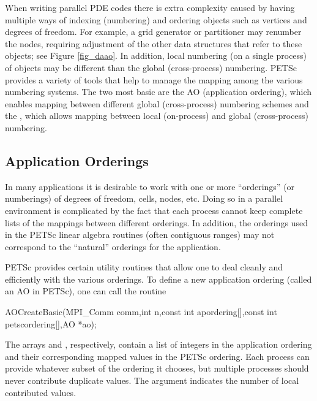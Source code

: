   When writing parallel PDE codes there is extra complexity caused by
having multiple ways of indexing (numbering) and ordering objects such
as vertices and degrees of freedom. For example, a grid generator
or partitioner may renumber the nodes, requiring adjustment of the
other data structures that refer to these objects; see Figure
\ref{fig_daao}.  In addition, local numbering (on a single process) 
of objects may be different than the global (cross-process)
numbering. PETSc provides a variety of tools that help to manage the
mapping among the various numbering systems. The two most basic are
the AO (application ordering), which enables mapping between
different global (cross-process) numbering schemes and the , which allows mapping between local 
(on-process) and global (cross-process) numbering.

\subsection{Application Orderings}
\label{sec_ao}
 

In many applications it is desirable to work with one or more
``orderings'' (or numberings) of degrees of freedom, cells, nodes,
etc.   Doing so in a parallel environment is
complicated by the fact that each process cannot keep complete lists
of the mappings between different orderings. In addition, the
orderings used in the PETSc linear algebra routines (often contiguous 
ranges) may not correspond to the ``natural'' orderings for the application.

PETSc provides certain utility routines that allow one to deal cleanly
and efficiently with the various orderings. To define a new application ordering
(called an AO in PETSc), one can call the routine 
\begin{tabbing}
  AOCreateBasic(MPI\_Comm comm,int n,const int apordering[],const int petscordering[],AO *ao);
\end{tabbing}
The  
arrays  and , respectively, contain a list of integers
in the application ordering and their corresponding mapped values in the PETSc 
ordering. Each process can provide whatever subset of the ordering it 
chooses, but multiple processes should never contribute duplicate values. 
The argument  indicates the number of local contributed values.

